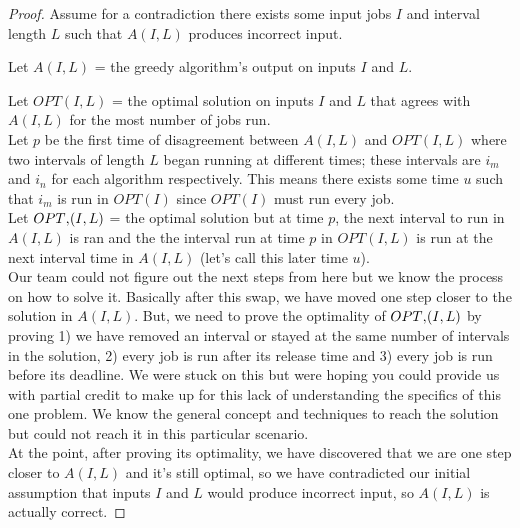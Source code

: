 \documentclass{article}
\begin{document}
	\begin{proof}
		Assume for a contradiction there exists some input jobs $I$ and interval length $L$ such that $A(I, L)$ produces incorrect input.
		
		Let $A(I, L)$ = the greedy algorithm's output on inputs $I$ and $L$.
		
		Let $OPT(I, L)$ = the optimal solution on inputs $I$ and $L$ that agrees
		with $A(I, L)$ for the most number of jobs run.\\
		
		Let $p$ be the first time of disagreement between $A(I, L)$ and $OPT(I, L)$ where two intervals of length $L$ began running at different times; these intervals are $i_m$ and $i_n$ for each algorithm respectively.  This means there exists some time $u$ such that $i_m$ is run in $OPT(I)$ since $OPT(I)$ must run every job.\\
		
		Let $OPT\textsc{\char13}(I, L)$ = the optimal solution but at time $p$, the next interval to run in $A(I, L)$ is ran and the the interval run at time $p$ in $OPT(I, L)$ is run at the next interval time in $A(I, L)$ (let's call this later time $u$).\\
		
		Our team could not figure out the next steps from here but we know the process on how to solve it.  Basically after this swap, we have moved one step closer to the solution in $A(I, L)$.  But, we need to prove the optimality of $OPT\textsc{\char13}(I, L)$ by proving 1) we have removed an interval or stayed at the same number of intervals in the solution, 2) every job is run after its release time and 3) every job is run before its deadline.  We were stuck on this but were hoping you could provide us with partial credit to make up for this lack of understanding the specifics of this one problem.  We know the general concept and techniques to reach the solution but could not reach it in this particular scenario.\\
		
		At the point, after proving its optimality, we have discovered that we are one step closer to $A(I, L)$ and it's still optimal, so we have contradicted our initial assumption that inputs $I$ and $L$ would produce incorrect input, so $A(I, L)$ is actually correct.		
	\end{proof}
\end{document}
